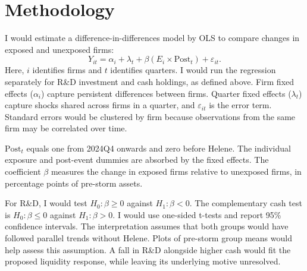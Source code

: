 \section*{Methodology}

I would estimate a difference-in-differences model by OLS to compare changes in exposed and unexposed firms:
\begin{equation*}
  Y_{it} = \alpha_i + \lambda_t
  + \beta(E_i \times \mathrm{Post}_t) + \varepsilon_{it}.
\end{equation*}
Here, $i$ identifies firms and $t$ identifies quarters. I would run the regression separately for R\&D investment and cash holdings, as defined above. Firm fixed effects ($\alpha_i$) capture persistent differences between firms. Quarter fixed effects ($\lambda_t$) capture shocks shared across firms in a quarter, and $\varepsilon_{it}$ is the error term. Standard errors would be clustered by firm because observations from the same firm may be correlated over time.

$\mathrm{Post}_t$ equals one from 2024Q4 onwards and zero before Helene. The individual exposure and post-event dummies are absorbed by the fixed effects. The coefficient $\beta$ measures the change in exposed firms relative to unexposed firms, in percentage points of pre-storm assets.

For R\&D, I would test $H_0: \beta \geq 0$ against $H_1: \beta < 0$. The complementary cash test is $H_0: \beta \leq 0$ against $H_1: \beta > 0$. I would use one-sided t-tests and report 95\% confidence intervals. The interpretation assumes that both groups would have followed parallel trends without Helene. Plots of pre-storm group means would help assess this assumption. A fall in R\&D alongside higher cash would fit the proposed liquidity response, while leaving its underlying motive unresolved.
